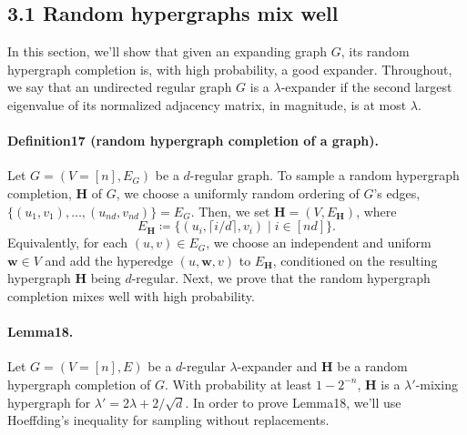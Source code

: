 \subsection*{3.1 Random hypergraphs mix well}
In this section, we'll show that given an expanding graph $G$, its random hypergraph completion is, with high probability, a good expander. Throughout, we say that an undirected regular graph $G$ is a $\lambda$-expander if the second largest eigenvalue of its normalized adjacency matrix, in magnitude, is at most $\lambda$.
\paragraph{Definition17 (random hypergraph completion of a graph).} Let $G=(V=[n],E_G)$ be a $d$-regular graph. To sample a random hypergraph completion, $\mathbf H$ of $G$, we choose a uniformly random ordering of $G$'s edges, $\{(u_1,v_1),\ldots,(u_{nd},v_{nd})\}=E_G$. Then, we set $\mathbf H=(V,E_{\mathbf H})$, where
\[E_{\mathbf H}\coloneqq\{(u_i,\lceil i/d\rceil,v_i)\mid i\in[nd]\}.\]
Equivalently, for each $(u,v)\in E_G$, we choose an independent and uniform $\mathbf w\in V$ and add the hyperedge $(u,\mathbf w,v)$ to $E_{\mathbf H}$, conditioned on the resulting hypergraph $\mathbf H$ being $d$-regular.
Next, we prove that the random hypergraph completion mixes well with high probability.
\paragraph{Lemma18.} Let $G=(V=[n],E)$ be a $d$-regular $\lambda$-expander and $\mathbf H$ be a random hypergraph completion of $G$. With probability at least $1-2^{-n}$, $\mathbf H$ is a $\lambda'$-mixing hypergraph for $\lambda'=2\lambda+2/\sqrt d$.
In order to prove Lemma18, we'll use Hoeffding's inequality for sampling without replacements.
